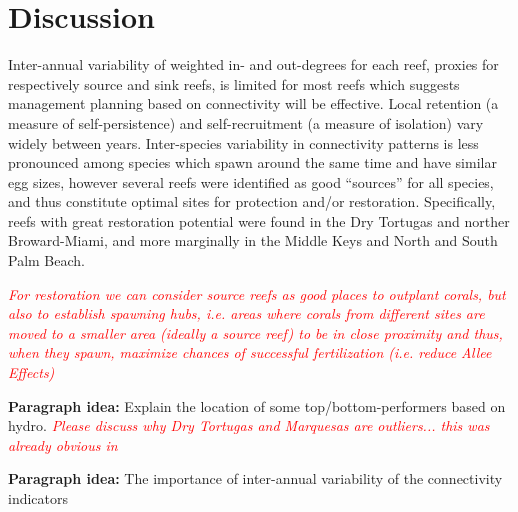 \documentclass[preprint,12pt,authoryear]{elsarticle}
\newcommand{\emphc}[1]{\emph{\textcolor{red}{#1}}}
\begin{document}

\section*{Discussion}

Inter-annual variability of weighted in- and out-degrees for each reef, proxies for respectively source and sink reefs, is limited for most reefs which suggests management planning based on connectivity will be effective. Local retention (a measure of self-persistence) and  self-recruitment (a measure of isolation) vary widely between years. Inter-species variability in connectivity patterns is less pronounced among species which spawn around the same time and have similar egg sizes, however several reefs were identified as good “sources” for all species, and thus constitute optimal sites for protection and/or restoration. Specifically, reefs with great restoration potential were found in the Dry Tortugas and norther Broward-Miami, and more marginally in the Middle Keys and North and South Palm Beach.

\emphc{For restoration we can consider source reefs as good places to outplant corals, but also to establish spawning hubs, i.e. areas where corals from different sites are moved to a smaller area (ideally a source reef) to be in close proximity and thus, when they spawn, maximize chances of successful fertilization (i.e. reduce Allee Effects)}

\textbf{Paragraph idea:} Explain the location of some top/bottom-performers based on hydro. \emphc{Please discuss why Dry Tortugas and Marquesas are outliers... this was already obvious in \cite{king2023larval}}

\textbf{Paragraph idea:} The importance of inter-annual variability of the connectivity indicators
\end{document}
